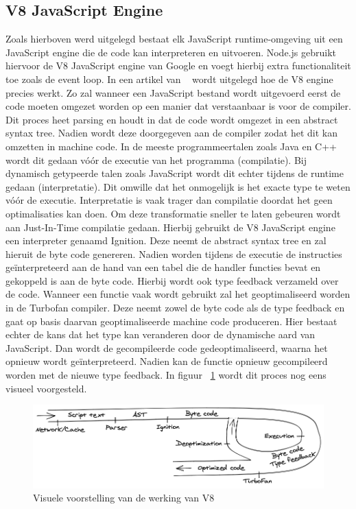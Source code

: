 \subsection{V8 JavaScript Engine}
Zoals hierboven werd uitgelegd bestaat elk JavaScript runtime-omgeving uit een JavaScript engine die de code kan interpreteren en uitvoeren.
Node.js gebruikt hiervoor de V8 JavaScript engine van Google en voegt hierbij extra functionaliteit toe zoals de event loop.
In een artikel van ~\textcite{Lyamkin2020} wordt uitgelegd hoe de V8 engine precies werkt. 
Zo zal wanneer een JavaScript bestand wordt uitgevoerd eerst de code moeten omgezet worden op een manier dat verstaanbaar is voor de compiler.
Dit proces heet parsing en houdt in dat de code wordt omgezet in een abstract syntax tree. 
Nadien wordt deze doorgegeven aan de compiler zodat het dit kan omzetten in machine code. 
In de meeste programmeertalen zoals Java en C++ wordt dit gedaan vóór de executie van het programma (compilatie).
Bij dynamisch getypeerde talen zoals JavaScript wordt dit echter tijdens de runtime gedaan (interpretatie). 
Dit omwille dat het onmogelijk is het exacte type te weten vóór de executie.
Interpretatie is vaak trager dan compilatie doordat het geen optimalisaties kan doen.
Om deze transformatie sneller te laten gebeuren wordt aan Just-In-Time compilatie gedaan.
Hierbij gebruikt de V8 JavaScript engine een interpreter genaamd Ignition. Deze neemt de abstract syntax tree en zal hieruit de byte code genereren.
Nadien worden tijdens de executie de instructies geïnterpreteerd aan de hand van een tabel die de handler functies bevat en gekoppeld 
is aan de byte code.
Hierbij wordt ook type feedback verzameld over de code. 
Wanneer een functie vaak wordt gebruikt zal het geoptimaliseerd worden in de Turbofan compiler.
Deze neemt zowel de byte code als de type feedback en gaat op basis daarvan geoptimaliseerde machine code produceren.
Hier bestaat echter de kans dat het type kan veranderen door de dynamische aard van JavaScript. 
Dan wordt de gecompileerde code gedeoptimaliseerd, waarna het opnieuw wordt geïnterpreteerd.
Nadien kan de functie opnieuw gecompileerd worden met de nieuwe type feedback.
In figuur ~\ref{fig:v8} wordt dit proces nog eens visueel voorgesteld.
\begin{figure}[h]
    \centering
    \includegraphics[width=.9\textwidth]{graphics/v8.png}
    \caption[Werking V8 engine]{\label{fig:v8}Visuele voorstelling van de werking van V8 ~\autocite{Lyamkin2020}}
\end{figure}

